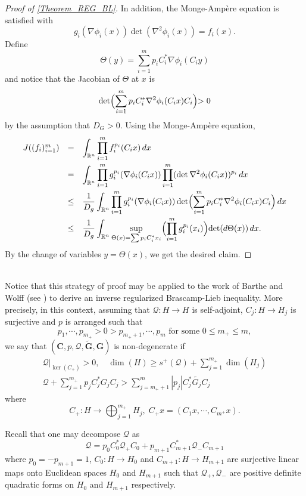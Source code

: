 \documentclass[11pt,a4paper,reqno]{amsart}
\numberwithin{equation}{section}
\theoremstyle{definition}
\newcommand{\nm}{\noalign{\smallskip}}
\newcommand{\ds}{\displaystyle}
\renewcommand{\tilde}{\widetilde}
\newcommand{\<}{\ensuremath \leq}
\renewcommand{\>}{\ensuremath \geq}
\renewcommand{\tilde}{\widetilde}
\begin{document}
\begin{proof}[Proof of \cref{Theorem_REG_BL}]
In addition, the Monge-Ampère equation is satisfied with $$g_i(\nabla \phi_i(x))\det(\nabla^2\phi_i(x))=f_i(x).$$ Define $$\Theta(y)=\sum_{i=1}^m p_iC_i^*\nabla\phi_i(C_iy)$$ and notice that the Jacobian of $\Theta$ at $x$ is $$\det \Bigl(\sum_{i=1}^m p_iC_i^*\nabla^2 \phi_i(C_ix)C_i \Bigl)>0$$ by the assumption that $D_G>0.$ Using the Monge-Ampère equation, $$\begin{array}{lll}
J((f_i)_{i=1}^m) &=& \ds \int_{\mathbb{R}^n}\prod_{i=1}^m f_i^{p_i}(C_ix)\, dx \\
\nm 
&=& \ds \int_{\mathbb{R}^n}\prod_{i=1}^m g_i^{p_i}(\nabla \phi_i(C_ix))\prod_{i=1}^m (\det \nabla^2 \phi_i(C_ix))^{p_i}\, dx \\
\nm 
&\leq& \ds \frac{1}{D_g}\int_{\mathbb{R}^n}\prod_{i=1}^m g_i^{p_i}(\nabla \phi_i(C_ix)) \det \Bigl( \sum_{i=1}^m p_iC_i^* \nabla^2\phi_i(C_ix)C_i \Bigl ) \, dx \\
\nm 
&\leq& \ds \frac{1}{D_g}\int_{\mathbb{R}^n}\sup_{\Theta(x)=\sum p_iC_i^*x_i} \Bigl( \prod_{i=1}^m g_i^{p_i}(x_i) \Bigl) \det(d\Theta(x)) \, dx.
\end{array}$$ By the change of variables $y=\Theta(x)$, we get the desired claim. 
\end{proof}

\hfill \\


Notice that this strategy of proof may be applied to the work of Barthe and Wolff (see \cite{Barthe_Wolff}) to derive an inverse regularized Brascamp-Lieb inequality. More precisely, in this context, assuming that $\mathcal{Q}:H \rightarrow H$ is self-adjoint, $C_j:H \rightarrow H_j$ is surjective and $p$ is arranged such that $$p_1,\cdots,p_{m_+}>0>p_{m_++1},\cdots,p_m \text{ for some } 0\le m_+ \le m,$$  we say that $(\textbf{C},p,\mathcal Q,\tilde{\textbf{G}},\textbf{G})$ is non-degenerate if $$\begin{array}{lll}
\ds \mathcal Q|_{\ker(C_+)}>0, \quad \dim(H) \geq s^+(\mathcal Q)+\sum_{j=1}^{m_+}\dim(H_j) \\
\ds \mathcal Q+\sum_{j=1}^{m_+} p_jC_j^*G_jC_j>\sum_{j=m_++1}^m |p_j|C_j^*\tilde{G_j}C_j
\end{array}$$ where $$C_+:H \rightarrow \bigoplus_{j=1}^{m_+}H_j, \; C_+x=(C_1x,\cdots,C_{m^+}x).$$ 

Recall that one may decompose $\mathcal Q$ as $$\mathcal Q=p_0C_0^*\mathcal Q_+C_0+p_{m+1}C_{m+1}^*\mathcal Q_-C_{m+1}$$ where $p_0=-p_{m+1}=1$, $C_0: H \rightarrow H_0$ and $C_{m+1}: H \rightarrow H_{m+1}$ are surjective linear maps onto Euclidean spaces $H_0$ and $H_{m+1}$ such that $\mathcal Q_+, \mathcal Q_-$ are positive definite quadratic forms on $H_0$ and $H_{m+1}$ respectively. 
\end{document}
